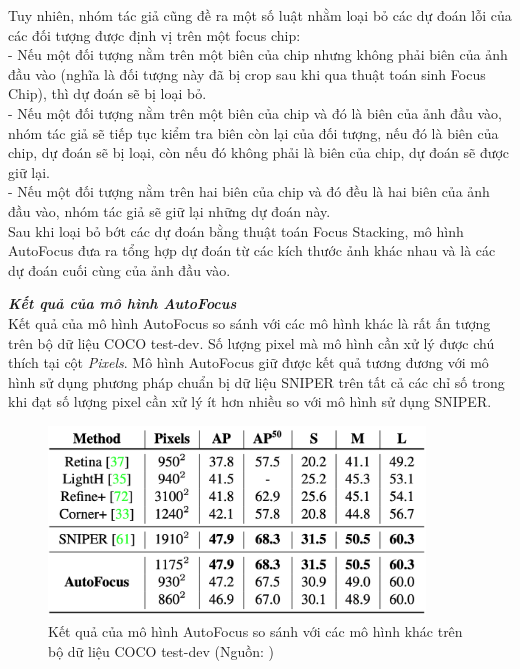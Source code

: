 {    \noindent
    Tuy nhiên, nhóm tác giả cũng đề ra một số luật nhằm loại bỏ các dự đoán lỗi của các đối tượng được định vị trên một focus chip: \\
    - Nếu một đối tượng nằm trên một biên của chip nhưng không phải biên của ảnh đầu vào (nghĩa là đối tượng này đã bị crop sau khi qua thuật toán sinh Focus Chip), thì dự đoán sẽ bị loại bỏ. \\
    - Nếu một đối tượng nằm trên một biên của chip và đó là biên của ảnh đầu vào, nhóm tác giả sẽ tiếp tục kiểm tra biên còn lại của đối tượng, nếu đó là biên của chip, dự đoán sẽ bị loại, còn nếu đó không phải là biên của chip, dự đoán sẽ được giữ lại. \\
    - Nếu một đối tượng nằm trên hai biên của chip và đó đều là hai biên của ảnh đầu vào, nhóm tác giả sẽ giữ lại những dự đoán này. \\
    Sau khi loại bỏ bớt các dự đoán bằng thuật toán Focus Stacking, mô hình AutoFocus đưa ra tổng hợp dự đoán từ các kích thước ảnh khác nhau và là các dự đoán cuối cùng của ảnh đầu vào.

    \noindent
    \textbf{\textit{Kết quả của mô hình AutoFocus}} \\
    Kết quả của mô hình AutoFocus so sánh với các mô hình khác là rất ấn tượng trên bộ dữ liệu COCO test-dev.
    Số lượng pixel mà mô hình cần xử lý được chú thích tại cột \textit{Pixels}.
    Mô hình AutoFocus giữ được kết quả tương đương với mô hình sử dụng phương pháp chuẩn bị dữ liệu SNIPER trên tất cả các chỉ số trong khi đạt số lượng pixel cần xử lý ít hơn nhiều so với mô hình sử dụng SNIPER.

    \begin{figure}[H]
        \centering
        \includegraphics[width=10cm] {images/autofocus_results_1}
        \caption{Kết quả của mô hình AutoFocus so sánh với các mô hình khác trên bộ dữ liệu COCO test-dev (Nguồn: \cite{najibi2019autofocus})}
        \label{fig:autofocus_results_1}
    \end{figure}

}
